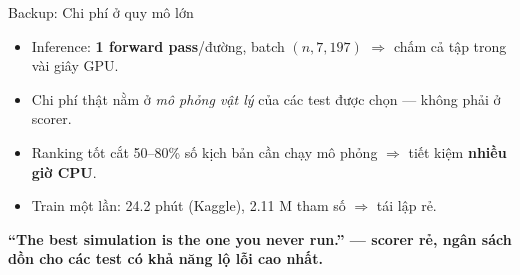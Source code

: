 \documentclass[aspectratio=169,10pt]{beamer}
\newcommand{\takeaway}[1]{%
  \vspace{0.3em}%
  \begin{mdframed}[linecolor=mLightBrown,linewidth=1.2pt,
    backgroundcolor=mLightBrown!8,
    innertopmargin=4pt,innerbottommargin=4pt,
    innerleftmargin=8pt,innerrightmargin=8pt,roundcorner=2pt]
  \centering\footnotesize\bfseries\color{mDarkTeal} #1
  \end{mdframed}}
\begin{document}
\begin{frame}{Backup: Chi phí ở quy mô lớn}
\footnotesize
\begin{itemize}\setlength{\itemsep}{0.5em}
  \item Inference: \textbf{1 forward pass}/đường, batch $(n,7,197)$ $\Rightarrow$ chấm cả tập trong vài giây GPU.
  \item Chi phí thật nằm ở \emph{mô phỏng vật lý} của các test được chọn — không phải ở scorer.
  \item Ranking tốt cắt 50--80\% số kịch bản cần chạy mô phỏng $\Rightarrow$ tiết kiệm \textbf{nhiều giờ CPU}.
  \item Train một lần: 24.2 phút (Kaggle), 2.11 M tham số $\Rightarrow$ tái lập rẻ.
\end{itemize}
\takeaway{``The best simulation is the one you never run.'' — scorer rẻ, ngân sách dồn cho các test có khả năng lộ lỗi cao nhất.}
\end{frame}
\end{document}
